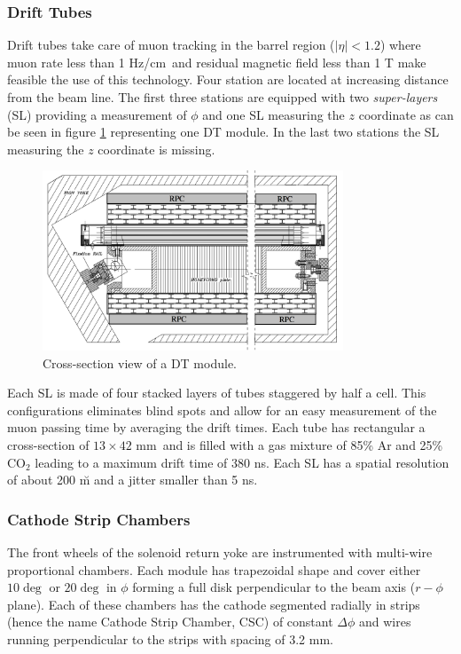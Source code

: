 \subsubsection*{Drift Tubes}

Drift tubes take care of muon tracking in the barrel region ($|\eta| < 1.2$) where muon rate less than 1 Hz/cm\sq ~and residual magnetic field less than 1 T make feasible the use of this technology. Four station are located at increasing distance from the beam line. The first three stations are equipped with two \emph{super-layers} (SL) providing a measurement of $\phi$ and one SL measuring the $z$ coordinate as can be seen in figure \ref{fig:dt_module} representing one DT module. In the last two stations the SL measuring the $z$ coordinate is missing. 

\begin{figure}
\begin{center}
\includegraphics[angle=-0,width=0.8\textwidth]{2_LHC_and_CMS/pics/cms_dt.png}
\caption{Cross-section view of a DT module.
\label{fig:dt_module}
}
\end{center}
\end{figure}


Each SL is made of four stacked layers of tubes staggered by half a cell. This configurations eliminates blind spots and allow for an easy measurement of the muon passing time by averaging the drift times. Each tube has rectangular a cross-section of $13\times42$ mm\sq ~and is filled with a gas mixture of 85\% Ar and 25\% CO$_2$ leading to a maximum drift time of 380 ns. Each SL has a spatial resolution of about 200 \u m and a jitter smaller than 5 ns.

\subsubsection*{Cathode Strip Chambers}

The front wheels of the solenoid return yoke are instrumented with multi-wire proportional chambers. Each module has trapezoidal shape and cover either $10\deg$ or $20\deg$ in $\phi$ forming a full disk perpendicular to the beam axis ($r-\phi$ plane). Each of these chambers has the cathode segmented radially in strips (hence the name Cathode Strip Chamber, CSC) of constant $\Delta\phi$ and wires running perpendicular to the strips with spacing of 3.2 mm. 

